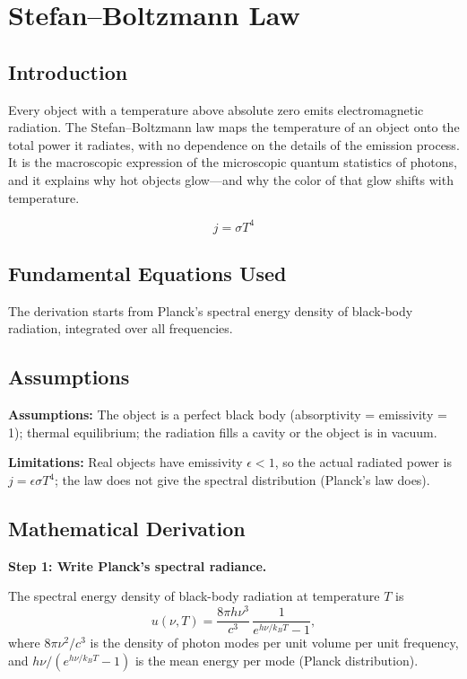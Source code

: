 \chapter{Stefan--Boltzmann Law}

\section*{Introduction}

Every object with a temperature above absolute zero emits electromagnetic radiation. The Stefan--Boltzmann law maps the temperature of an object onto the total power it radiates, with no dependence on the details of the emission process. It is the macroscopic expression of the microscopic quantum statistics of photons, and it explains why hot objects glow---and why the color of that glow shifts with temperature.


\begin{equation}
j = \sigma T^4
\end{equation}

\section*{Fundamental Equations Used}

The derivation starts from Planck's spectral energy density of black-body radiation, integrated over all frequencies.

\section*{Assumptions}

\textbf{Assumptions:} The object is a perfect black body (absorptivity = emissivity = 1); thermal equilibrium; the radiation fills a cavity or the object is in vacuum.


\textbf{Limitations:} Real objects have emissivity $\epsilon < 1$, so the actual radiated power is $j = \epsilon\sigma T^4$; the law does not give the spectral distribution (Planck's law does).


\section*{Mathematical Derivation}

\textbf{Step 1: Write Planck's spectral radiance.}

The spectral energy density of black-body radiation at temperature $T$ is
\begin{equation}
u(\nu,T) = \frac{8\pi h\nu^3}{c^3}\,\frac{1}{e^{h\nu/k_BT} - 1},
\end{equation}
where $8\pi\nu^2/c^3$ is the density of photon modes per unit volume per unit frequency, and $h\nu/(e^{h\nu/k_BT}-1)$ is the mean energy per mode (Planck distribution).

